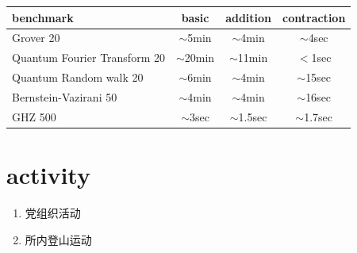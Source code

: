\documentclass[aspectratio=1610,18pt]{ctexbeamer}
\begin{document}
\begin{frame}
  \begin{table}[]
    \Large
    \rule{0pt}{30pt}
    \begin{tabular}{l|ccc}
    benchmark & basic & addition& contraction \\\hline
    Grover 20       & $\sim$5min  & $\sim$4min & $\sim$4sec  \\
    Quantum Fourier Transform 20           & $\sim$20min & $\sim$11min & $<$1sec \\
    Quantum Random walk 20           & $\sim$6min & $\sim$4min & $\sim$15sec\\
    Bernstein-Vazirani 50           & $\sim$4min & $\sim$4min & $\sim$16sec \\
    GHZ 500         & $\sim$3sec & $\sim$1.5sec & $\sim$1.7sec\\
    \end{tabular}
    \end{table}
\end{frame}
\section{activity}
\begin{frame}
  \begin{enumerate}
    \item 党组织活动
    \item 所内登山运动
  \end{enumerate}
\end{frame}
\begin{frame}
  \begin{figure}
    \\
  \end{figure}
\end{frame}
\end{document}
